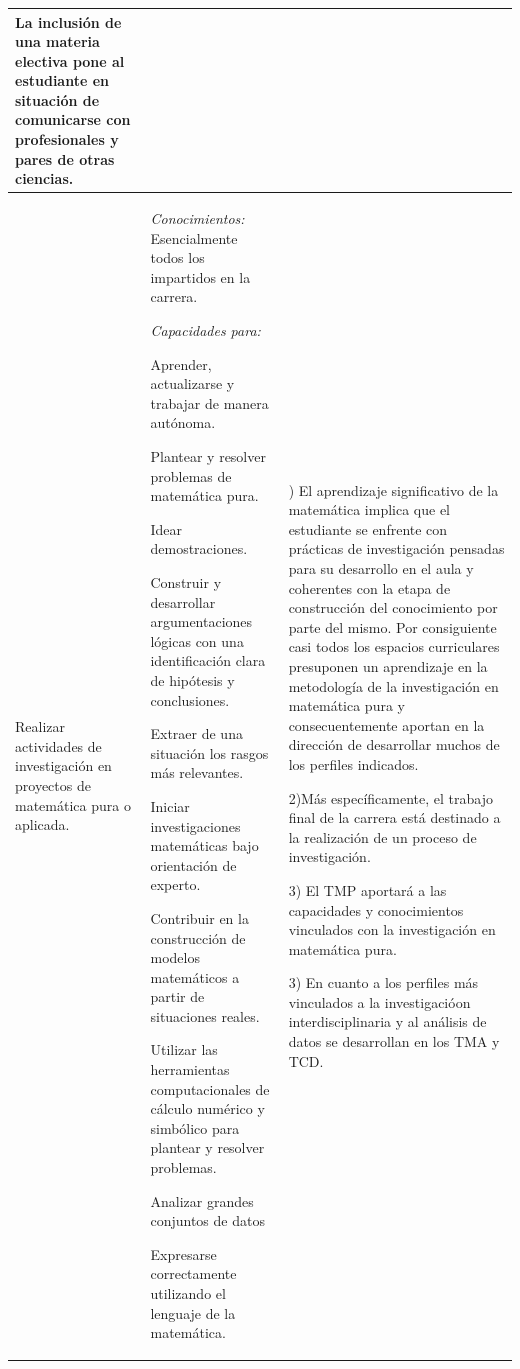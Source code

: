 \documentclass[a4paper, 12pt]{article}
\begin{document}
\begin{center}
\begin{tabularx}{1.0\textwidth}{|>{\raggedright\arraybackslash}X |
>{\raggedright\arraybackslash}X |
>{\raggedright\arraybackslash}X |
}
 La inclusión de una materia electiva pone al estudiante en situación de comunicarse con profesionales y pares de otras ciencias.
 
  \\ \hline

  
  Realizar actividades de investigación en proyectos de matemática pura o aplicada.
  & 
  \emph{Conocimientos:}  Esencialmente todos los impartidos en la carrera.
  
  \emph{Capacidades para:}
  
   Aprender, actualizarse y trabajar de manera autónoma.
   
  Plantear y resolver problemas de matemática pura.
  
 Idear demostraciones.

  Construir y desarrollar argumentaciones lógicas con
una identificación clara de hipótesis y conclusiones.

Extraer de una situación los rasgos más
relevantes.

Iniciar investigaciones matemáticas bajo orientación
de experto.


 Contribuir en la construcción de modelos matemáticos a partir de situaciones reales.
 
Utilizar las herramientas computacionales de cálculo
numérico y simbólico para plantear y resolver problemas.

Analizar grandes conjuntos de datos

Expresarse correctamente utilizando el lenguaje de la matemática.

  
  
  &1) El aprendizaje significativo de la matemática implica que el estudiante se enfrente con prácticas de investigación pensadas para su desarrollo en el aula y coherentes con  la etapa de construcción del conocimiento por parte del mismo. Por consiguiente casi todos los espacios curriculares presuponen un aprendizaje en la metodología de la investigación en matemática pura y consecuentemente aportan en la dirección de desarrollar muchos de los perfiles indicados.
  
  2)Más específicamente, el trabajo final de la carrera está destinado a la realización de un proceso de investigación.
  
  3) El TMP aportará a las capacidades y conocimientos vinculados con la investigación en matemática pura. 
  
  3) En cuanto a los perfiles más vinculados a la investigacióon interdisciplinaria y al análisis de datos se desarrollan en los TMA y TCD. 
  

\end{tabularx}
\end{center}
\end{document}
